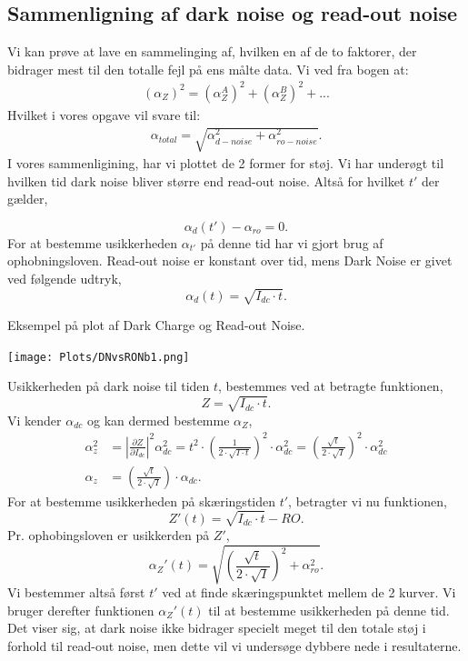 \documentclass[working]{tuftebook}
\begin{document}
\subsection{Sammenligning af dark noise og read-out noise}
Vi kan prøve at lave en sammelinging af, hvilken en af de to faktorer, der bidrager mest til den totalle fejl på ens målte data. Vi ved fra bogen  at: 
\begin{align*}
(\alpha_Z)^2 =(\alpha_Z^A)^2+(\alpha_Z^B)^2 + ...
\end{align*}
Hvilket i vores opgave vil svare til:
\begin{align*}
\alpha_{total} = \sqrt{\alpha_{d-noise}^2 + \alpha_{ro-noise}^2}. 
\end{align*}
I vores sammenligining, har vi plottet de 2 former for støj. Vi har underøgt til hvilken tid dark noise bliver større end read-out noise. Altså for hvilket $t'$ der gælder,

\[
	\alpha _{d} \left( t' \right)  - \alpha _{ro} = 0
.\]
For at bestemme usikkerheden $\alpha _{t'}$ på denne tid har vi gjort brug af ophobningsloven. Read-out noise er konstant over tid, mens Dark Noise er givet ved følgende udtryk,
\[
\alpha _d \left( t \right) = \sqrt{I_{dc}\cdot t} 
.\]
\begin{marginfigure}
	\centering
	\caption{Eksempel på plot af Dark Charge og Read-out Noise.}
	\texttt{[image: Plots/DNvsRONb1.png]}
\end{marginfigure}
Usikkerheden på dark noise til tiden $t$, bestemmes ved at betragte funktionen,
\[
Z = \sqrt{I_{dc}\cdot t} 
.\] 
Vi kender $\alpha _{dc}$ og kan dermed bestemme $\alpha _Z$,
\begin{align*}
	\alpha_{z}^2 &= \left| \frac{\partial Z}{\partial I_{dc}} \right|^2\alpha_{dc}^2 = t^2 \cdot \left( \frac{1}{2\cdot \sqrt{I\cdot t} } \right)^2\cdot \alpha _{dc}^2 = \left( \frac{\sqrt{t}}{ 2\cdot \sqrt{I}} \right)^2 \cdot \alpha _{dc}^2 \\
	\alpha _z &= \left( \frac{\sqrt{t} }{2\cdot \sqrt{I} } \right) \cdot \alpha _{dc}
.\end{align*}
For at bestemme usikkerheden på skæringstiden $t'$, betragter vi nu funktionen,
 \[
Z'\left( t \right) = \sqrt{I_{dc}\cdot t} - RO
.\] 
Pr. ophobingsloven er usikkerden på $Z'$,
 \[
\alpha _Z'\left( t \right)  = \sqrt{\left( \frac{\sqrt{t} }{2\cdot \sqrt{I} } \right)^2 + \alpha _{ro}^2 }
.\]
Vi bestemmer altså først $t'$ ved at finde skæringspunktet mellem de 2 kurver. Vi bruger derefter funktionen $\alpha _Z'\left( t \right) $ til at bestemme usikkerheden på denne tid. \\
Det viser sig, at dark noise ikke bidrager specielt meget til den totale støj i forhold til read-out noise, men dette vil vi undersøge dybbere nede i resultaterne.
\end{document}
